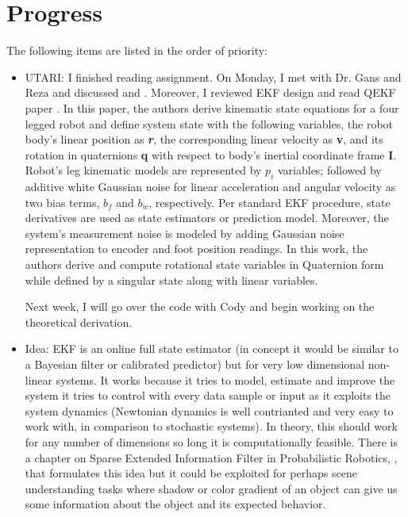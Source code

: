\documentclass[11pt]{article}
\begin{document}
\section{Progress}
The following items are listed in the order of priority:
\begin{itemize}
      \item UTARI: I finished reading \cite{ma2012invitation} assignment.
      On Monday, I met with Dr. Gans and Reza and discussed \cite{QuEst} and \cite{dani2009position}. Moreover, I reviewed EKF design and read QEKF paper \cite{6577984}. In this paper, the authors derive kinematic state equations for a four legged robot and define system state with the following variables, the robot body's linear position as \textbf{\textit{r}}, the corresponding linear velocity as \textbf{v}, and its rotation in quaternions \textbf{q} with respect to body's inertial coordinate frame
      \textbf{I}. Robot's leg kinematic models are represented by $p_i$ variables; followed by additive white Gaussian noise for linear acceleration and angular velocity as two bias terms, $b_f$ and $b_w$, respectively. Per standard EKF procedure, state derivatives are used as state estimators or prediction model. Moreover, the system's measurement noise is modeled by adding Gaussian noise representation to encoder and foot position readings. In this work, the authors derive and compute rotational state variables in Quaternion form while defined by a singular state along with linear variables.

      Next week, I will go over the code with Cody and begin working on the theoretical derivation.

      \item Idea: EKF is an online full state estimator (in concept it would be similar to a Bayesian filter or calibrated predictor) but for very low dimensional non-linear systems. It works because it tries to model, estimate and improve the system it tries to control with every data sample or input as it exploits the system dynamics (Newtonian dynamics is well contrianted and very easy to work with, in comparison to stochastic systems). In theory, this should work for any number of dimensions so long it is computationally feasible. There is a chapter on Sparse Extended Information Filter in Probabilistic Robotics, \cite{books/daglib/0014221}, that formulates this idea but it could be exploited for perhaps scene understanding tasks where shadow or color gradient of an object can give us some information about the object and its expected behavior.


\end{itemize}
\end{document}
